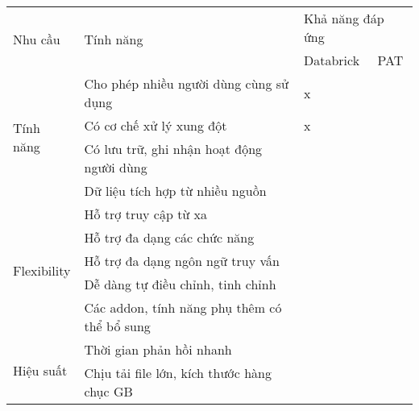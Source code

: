 \begin{longtable}{|l|p{5cm}|ll|}
\hline
\multirow{2}{*}{Nhu cầu}   & \multirow{2}{*}{Tính năng}                                              & \multicolumn{2}{l|}{Khả năng đáp ứng} \\ \cline{3-4} 
                             &                                                & \multicolumn{1}{l|}{Databrick} & PAT \\ \hline
\endhead
%
\multirow{4}{*}{Tính năng} & Cho phép nhiều người   dùng cùng sử dụng                                & \multicolumn{1}{l|}{x}        &        \\ \cline{2-4} 
                             & Có cơ chế xử   lý xung đột                     & \multicolumn{1}{l|}{x}          &     \\ \cline{2-4} 
                             & Có lưu trữ,   ghi nhận hoạt động người dùng    & \multicolumn{1}{l|}{}          &     \\ \cline{2-4} 
                             & Dữ liệu tích   hợp từ nhiều nguồn              & \multicolumn{1}{l|}{}          &     \\ \hline
\multirow{5}{*}{Flexibility} & Hỗ trợ truy cập từ xa                          & \multicolumn{1}{l|}{}          &     \\ \cline{2-4} 
                             & Hỗ trợ đa   dạng các chức năng                 & \multicolumn{1}{l|}{}          &     \\ \cline{2-4} 
                             & Hỗ trợ đa   dạng ngôn ngữ truy vấn             & \multicolumn{1}{l|}{}          &     \\ \cline{2-4} 
                             & Dễ dàng tự   điều chỉnh, tinh chỉnh            & \multicolumn{1}{l|}{}          &     \\ \cline{2-4} 
                             & Các addon,   tính năng phụ thêm có thể bổ sung & \multicolumn{1}{l|}{}          &     \\ \hline
\multirow{5}{*}{Hiệu suất}   & Thời gian phản hồi   nhanh                     & \multicolumn{1}{l|}{}          &     \\ \cline{2-4} 
                             & Chịu tải file   lớn, kích thước hàng chục GB   & \multicolumn{1}{l|}{}          &     \\ \cline{2-4} 

\end{longtable}
